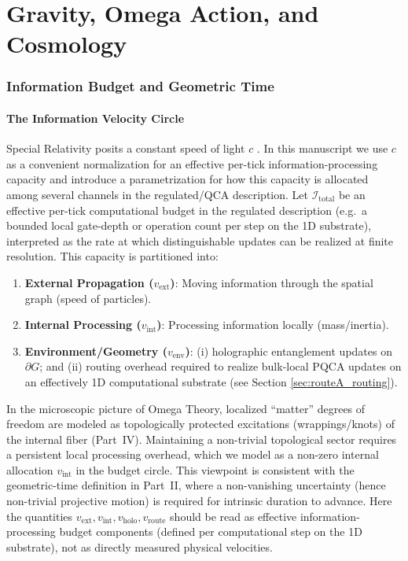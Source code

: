 \part{Gravity, Omega Action, and Cosmology}
\label{part:V}

\section{Information Budget and Geometric Time}
\label{chap:info_budget}

\subsection{The Information Velocity Circle}
Special Relativity posits a constant speed of light $c$ \cite{Carroll2004}. In this manuscript we use $c$ as a convenient normalization for an effective per-tick information-processing capacity and introduce a parametrization for how this capacity is allocated among several channels in the regulated/QCA description.
Let $\mathcal{I}_{\text{total}}$ be an effective per-tick computational budget in the regulated description (e.g.\ a bounded local gate-depth or operation count per step on the 1D substrate), interpreted as the rate at which distinguishable updates can be realized at finite resolution. This capacity is partitioned into:
\begin{enumerate}
    \item \textbf{External Propagation ($v_{\text{ext}}$)}: Moving information through the spatial graph (speed of particles).
    \item \textbf{Internal Processing ($v_{\text{int}}$)}: Processing information locally (mass/inertia).
    \item \textbf{Environment/Geometry ($v_{\text{env}}$)}: (i) holographic entanglement updates on $\partial G$; and (ii) routing overhead required to realize bulk-local PQCA updates on an effectively 1D computational substrate (see Section \ref{sec:routeA_routing}).
\end{enumerate}
In the microscopic picture of Omega Theory, localized ``matter'' degrees of freedom are modeled as topologically protected excitations (wrappings/knots) of the internal fiber (Part~IV). Maintaining a non-trivial topological sector requires a persistent local processing overhead, which we model as a non-zero internal allocation $v_{\text{int}}$ in the budget circle. This viewpoint is consistent with the geometric-time definition in Part~II, where a non-vanishing uncertainty (hence non-trivial projective motion) is required for intrinsic duration to advance.
Here the quantities $v_{\text{ext}},v_{\text{int}},v_{\text{holo}},v_{\text{route}}$ should be read as effective information-processing budget components (defined per computational step on the 1D substrate), not as directly measured physical velocities.
